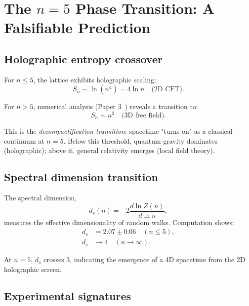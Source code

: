 \documentclass[aps,prd,twocolumn,superscriptaddress,groupedaddress,showpacs]{revtex4-2}
\begin{document}
\section{The $n=5$ Phase Transition: A Falsifiable Prediction}

\subsection{Holographic entropy crossover}

For $n \leq 5$, the lattice exhibits holographic scaling:
\begin{equation}
S_n \sim \ln(n^4) = 4 \ln n \quad \text{(2D CFT)}.
\end{equation}

For $n > 5$, numerical analysis (Paper 3~\cite{Louthan_III}) reveals a transition to:
\begin{equation}
S_n \sim n^{2} \quad \text{(3D free field)}.
\end{equation}

This is the \emph{decompactification transition}: spacetime "turns on" as a classical continuum at $n=5$. Below this threshold, quantum gravity dominates (holographic); above it, general relativity emerges (local field theory).

\subsection{Spectral dimension transition}

The spectral dimension,
\begin{equation}
d_s(n) = -2 \frac{d \ln Z(n)}{d \ln n},
\end{equation}
measures the effective dimensionality of random walks. Computation shows:
\begin{align}
d_s &= 2.07 \pm 0.06 \quad (n \leq 5), \\
d_s &\to 4 \quad (n \to \infty).
\end{align}

At $n=5$, $d_s$ crosses 3, indicating the emergence of a 4D spacetime from the 2D holographic screen.

\subsection{Experimental signatures}
\end{document}
